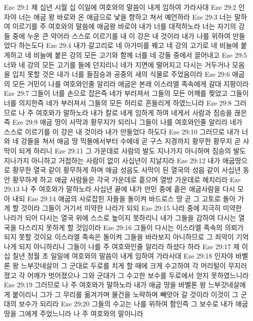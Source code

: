 Eze 29:1  제 십년 시월 십 이일에 여호와의 말씀이 내게 임하여 가라사대
Eze 29:2  인자야 너는 애굽 왕 바로와 온 애굽으로 낯을 향하고 쳐서 예언하라
Eze 29:3  너는 말하여 이르기를 주 여호와의 말씀에 애굽왕 바로야 내가 너를 대적하노라 너는 자기의 강들 중에 누운 큰 악어라 스스로 이르기를 내 이 강은 내 것이라 내가 나를 위하여 만들었다 하는도다
Eze 29:4  내가 갈고리로 네 아가미를 꿰고 네 강의 고기로 네 비늘에 붙게하고 네 비늘에 붙은 강의 모든 고기와 함께 너를 네 강들 중에서 끌어내고
Eze 29:5  너와 네 강의 모든 고기를 들에 던지리니 네가 지면에 떨어지고 다시는 거두거나 모음을 입지 못할 것은 내가 너를 들짐승과 공중의 새의 식물로 주었음이라
Eze 29:6  애굽의 모든 거민이 나를 여호와인줄 알리라 애굽은 본래 이스라엘 족속에게 갈대 지팡이라
Eze 29:7  그들이 너를 손으로 잡은즉 네가 부러져서 그들의 모든 어깨를 찢었고 그들이 너를 의지한즉 네가 부러져서 그들의 모든 허리로 흔들리게 하였느니라
Eze 29:8  그러므로 나 주 여호와가 말하노라 내가 칼로 네게 임하게 하여 네게서 사람과 짐승을 끊은즉
Eze 29:9  애굽 땅이 사막과 황무지가 되리니 그들이 나를 여호와인줄 알리라 네가 스스로 이르기를 이 강은 내 것이라 내가 만들었다 하도다
Eze 29:10  그러므로 내가 너와 네 강들을 쳐서 애굽 땅 믹돌에서부터 수에네 곧 구스 지경까지 황무한 황무지 곧 사막이 되게 하리니
Eze 29:11  그 가운데로 사람의 발도 지나가지 아니하며 짐승의 발도 지나가지 아니하고 거접하는 사람이 없이 사십년이 지날지라
Eze 29:12  내가 애굽땅으로 황무한 열국 같이 황무하게 하며 애굽 성읍도 사막이 된 열국의 성읍 같이 사십년 동안 황무하게 하고 애굽 사람들은 각국 가운데로 흩으며 열방 가운데로 헤치리라
Eze 29:13  나 주 여호와가 말하노라 사십년 끝에 내가 만민 중에 흩은 애굽사람을 다시 모아 내되
Eze 29:14  애굽의 사로잡힌 자들을 돌이켜 바드로스 땅 곧 그 고토로 돌아 가게 할 것이라 그들이 거기서 미약한 나라가 되되
Eze 29:15  나라 중에 지극히 미약한 나라가 되어 다시는 열국 위에 스스로 높이지 못하리니 내가 그들을 감하여 다시는 열국을 다스리지 못하게 할 것임이라
Eze 29:16  그들이 다시는 이스라엘 족속의 의뢰가 되지 못할 것이요 이스라엘 족속은 돌이켜 그들을 바라보지 아니하므로 그 죄악이 기억나게 되지 아니하리니 그들이 나를 주 여호와인줄 알리라 하셨다 하라
Eze 29:17  제 이십 칠년 정월 초 일일에 여호와의 말씀이 내게 임하여 가라사대
Eze 29:18  인자야 바벨론 왕 느부갓네살이 그 군대로 두로를 치게 할 때에 크게 수고하여 각 머리털이 무지러졌고 각 어깨가 벗어졌으나 그와 군대가 그 수고한 보수를 두로에서 얻지 못하였느니라
Eze 29:19  그러므로 나 주 여호와가 말하노라 내가 애굽 땅을 바벨론 왕 느부갓네살에게 붙이리니 그가 그 무리를 옮겨가며 물건을 노략하며 빼앗아 갈 것이라 이것이 그 군대의 보수가 되리라
Eze 29:20  그들의 수고는 나를 위하여 함인즉 그 보수로 내가 애굽 땅을 그에게 주었느니라 나 주 여호와의 말이니라
